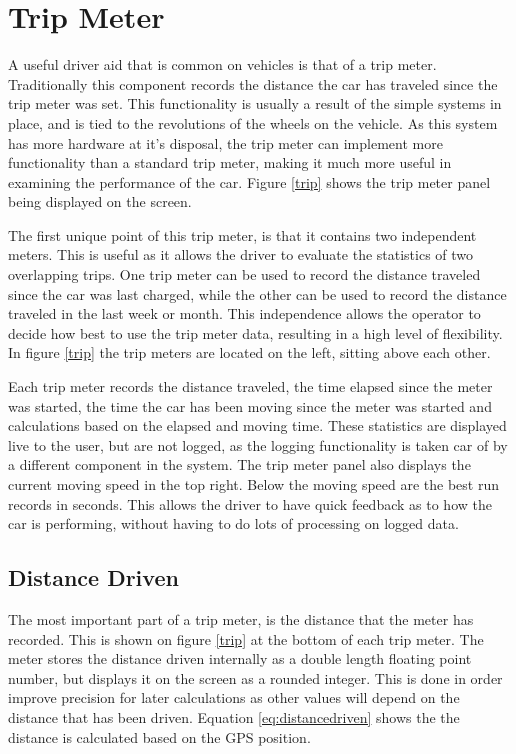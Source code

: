 

\section{Trip Meter}

A useful driver aid that is common on vehicles is that of a trip meter. Traditionally this component records the distance the car has traveled since the trip meter was set. This functionality is usually a result of the simple systems in place, and is tied to the revolutions of the wheels on the vehicle. As this system has more hardware at it's disposal, the trip meter can implement more functionality than a standard trip meter, making it much more useful in examining the performance of the car. Figure \ref{trip} shows the trip meter panel being displayed on the screen.


The first unique point of this trip meter, is that it contains two independent meters. This is useful as it allows the driver to evaluate the statistics of two overlapping trips. One trip meter can be used to record the distance traveled since the car was last charged, while the other can be used to record the distance traveled in the last week or month. This independence allows the operator to decide how best to use the trip meter data, resulting in a high level of flexibility. In figure \ref{trip} the trip meters are located on the left, sitting above each other.

Each trip meter records the distance traveled, the time elapsed since the meter was started, the time the car has been moving since the meter was started and calculations based on the elapsed and moving time. These statistics are displayed live to the user, but are not logged, as the logging functionality  is taken car of by a different component in the system. The trip meter panel also displays the current moving speed in the top right. Below the moving speed are the best run records in seconds. This allows the driver to have quick feedback as to how the car is performing, without having to do lots of processing on logged data.

\subsection{Distance Driven}
\label{sec:distancedriven}
The most important part of a trip meter, is the distance that the meter has recorded. This is shown on figure \ref{trip} at the bottom of each trip meter. The meter stores the distance driven internally as a double length floating point number, but displays it on the screen as a rounded integer. This is done in order improve precision for later calculations as other values will depend on the distance that has been driven. Equation \ref{eq:distancedriven} shows the the distance is calculated based on the GPS position.

